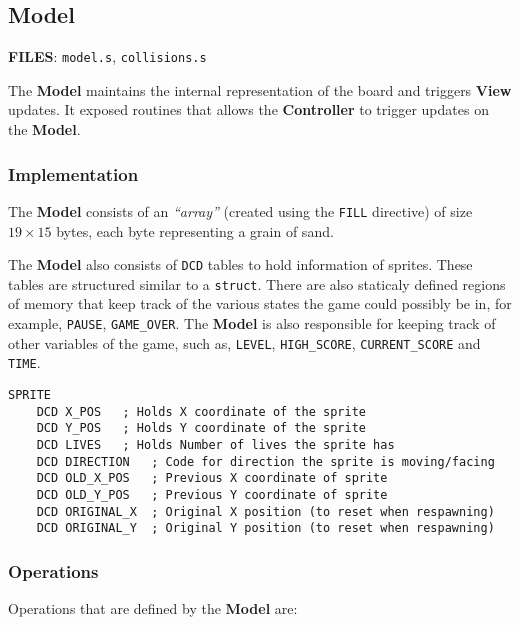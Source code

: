  \subsection{Model}

  \textbf{FILES}: \texttt{model.s}, \texttt{collisions.s}

  The \textbf{Model} maintains the internal representation of the board and triggers \textbf{View} updates. It exposed routines that allows the
  \textbf{Controller} to trigger updates on the \textbf{Model}.

    \subsubsection{Implementation}

    The \textbf{Model} consists of an \emph{``array''} (created using the \texttt{FILL} directive)
    of size $19 \times 15$ bytes, each byte representing a grain of sand.

    The \textbf{Model} also consists of \texttt{DCD} tables to hold information of sprites. These tables are structured similar to a \texttt{struct}.
    There are also staticaly defined regions of memory that keep track of the various states the game could possibly be in,
    for example, \texttt{PAUSE}, \texttt{GAME\_OVER}.
    The \textbf{Model} is also responsible for keeping track of other variables of the game,
    such as, \texttt{LEVEL}, \texttt{HIGH\_SCORE}, \texttt{CURRENT\_SCORE} and \texttt{TIME}.


    \begin{lstlisting}[float,floatplacement=H,caption={Structure for \texttt{SPRITE} data}]
SPRITE
	DCD X_POS	; Holds X coordinate of the sprite
	DCD Y_POS	; Holds Y coordinate of the sprite
	DCD LIVES	; Holds Number of lives the sprite has
	DCD DIRECTION	; Code for direction the sprite is moving/facing
	DCD OLD_X_POS	; Previous X coordinate of sprite
	DCD OLD_Y_POS	; Previous Y coordinate of sprite
	DCD ORIGINAL_X	; Original X position (to reset when respawning)
	DCD ORIGINAL_Y	; Original Y position (to reset when respawning)

    \end{lstlisting}

    \subsubsection{Operations}

    Operations that are defined by the \textbf{Model} are:

